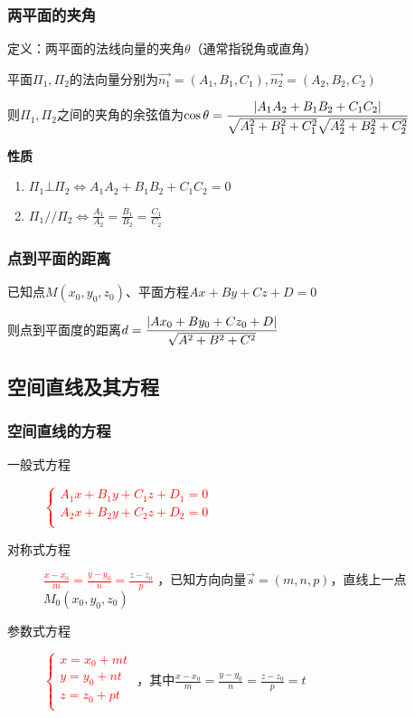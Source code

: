 \documentclass{article} %
\begin{document}
\subsubsection{两平面的夹角}
定义：两平面的法线向量的夹角$\theta$（通常指锐角或直角）\par
平面$\Pi_1,\Pi_2$的法向量分别为$\overrightarrow{n_1}=(A_1,B_1,C_1),\overrightarrow{n_2}=(A_2,B_2,C_2)$\par
则$\Pi_1,\Pi_2$之间的夹角的余弦值为\textcolor{red}{$\displaystyle\cos\theta={|A_1A_2+B_1B_2+C_1C_2|\over\sqrt{A_1^2+B_1^2+C_1^2}\sqrt{A_2^2+B_2^2+C_2^2}}$}\par

\textbf{性质}
\begin{enumerate}
    \item $\Pi_1\bot\Pi_2 \Leftrightarrow A_1A_2+B_1B_2+C_1C_2=0$
    \item $\displaystyle\Pi_1//\Pi_2 \Leftrightarrow\frac{A_1}{A_2}=\frac{B_1}{B_2}=\frac{C_1}{C_2}$
\end{enumerate}

\subsubsection{点到平面的距离}
已知点$M(x_0,y_0,z_0)$、平面方程$Ax+By+Cz+D=0$\par
则点到平面度的距离\textcolor{red}{$\displaystyle d={|Ax_0+By_0+Cz_0+D| \over \sqrt{A^2+B^2+C^2}}$}

\subsection{空间直线及其方程}
\subsubsection{空间直线的方程}
\begin{description}
    \item[一般式方程]{\textcolor{red}{
    $\left\{\begin{array}{l}
        A_1x+B_1y+C_1z+D_1=0 \\
        A_2x+B_2y+C_2z+D_2=0 \\
    \end{array}\right.$}
    }

    \item[对称式方程]{\textcolor{red}{
    $\displaystyle\frac{x-x_0}{m}=\frac{y-y_0}{n}=\frac{z-z_0}{p}$}
    ，已知方向向量$\overrightarrow{s}=(m,n,p)$，直线上一点$M_0(x_0,y_0,z_0)$
    }

    \item[参数式方程]{\textcolor{red}{
    $\left\{\begin{array}{l}
        x=x_0+mt \\
        y=y_0+nt \\
        z=z_0+pt \\
    \end{array}\right.$}
    ，其中$\displaystyle\frac{x-x_0}{m}=\frac{y-y_0}{n}=\frac{z-z_0}{p}=t$
    }

\end{description}
\end{document}
